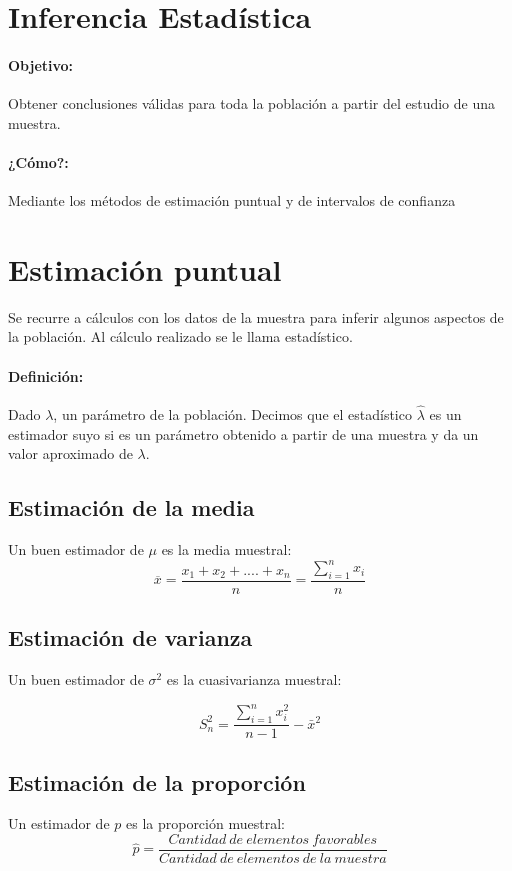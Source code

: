 \section{Inferencia Estadística}

\paragraph{Objetivo:} Obtener conclusiones válidas para toda la población a partir del estudio de una muestra.  

\paragraph{¿Cómo?:} Mediante los métodos de estimación puntual y de intervalos de confianza

\section{Estimación puntual} Se recurre a cálculos con los datos de la muestra para inferir algunos aspectos de la población. Al cálculo realizado se le llama estadístico.

\paragraph{Definición:} Dado $\lambda$, un parámetro de la población. Decimos que el estadístico $\widehat{\lambda}$
es un estimador suyo si es
un parámetro obtenido a partir de una muestra y da un valor
aproximado de $\lambda$.

\subsection{Estimación de la media}
Un buen estimador de $\mu$ es la media muestral:
$$\overline{x}= \frac{x_1 + x_2 + ....+x_n} {n}=\frac{{\sum_{i=1}^n x_i }}{n}$$

\subsection{Estimación de varianza}
Un buen estimador de $\sigma^2$ es la cuasivarianza muestral:

$$S_n^2=\frac{\sum_{i=1}^n x_i^2 }{n-1} - \bar x^2$$

\subsection{Estimación de la proporción}
Un estimador de $p$ es la proporción muestral:
$$\widehat{p}=\frac{Cantidad \ de \ elementos \ favorables}{Cantidad \ de \ elementos \ de \ la \ muestra}$$
